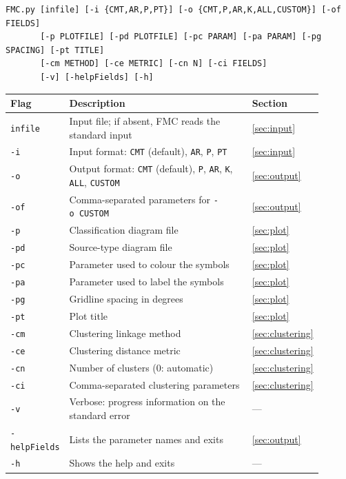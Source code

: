 \documentclass[11pt,a4paper,english]{article}
\numberwithin{equation}{section}
\begin{document}
\begin{lstlisting}
FMC.py [infile] [-i {CMT,AR,P,PT}] [-o {CMT,P,AR,K,ALL,CUSTOM}] [-of FIELDS]
       [-p PLOTFILE] [-pd PLOTFILE] [-pc PARAM] [-pa PARAM] [-pg SPACING] [-pt TITLE]
       [-cm METHOD] [-ce METRIC] [-cn N] [-ci FIELDS]
       [-v] [-helpFields] [-h]
\end{lstlisting}

\begin{longtable}{p{0.163\linewidth}p{0.631\linewidth}p{0.102\linewidth}}
\toprule
\textbf{Flag} & \textbf{Description} & \textbf{Section} \\
\midrule
\endhead
\texttt{infile} & Input file; if absent, FMC reads the standard input & \ref{sec:input} \\
\texttt{-i} & Input format: \texttt{CMT} (default), \texttt{AR}, \texttt{P}, \texttt{PT} & \ref{sec:input} \\
\texttt{-o} & Output format: \texttt{CMT} (default), \texttt{P}, \texttt{AR}, \texttt{K}, \texttt{ALL}, \texttt{CUSTOM} & \ref{sec:output} \\
\texttt{-of} & Comma-separated parameters for \texttt{-o\ CUSTOM} & \ref{sec:output} \\
\texttt{-p} & Classification diagram file & \ref{sec:plot} \\
\texttt{-pd} & Source-type diagram file & \ref{sec:plot} \\
\texttt{-pc} & Parameter used to colour the symbols & \ref{sec:plot} \\
\texttt{-pa} & Parameter used to label the symbols & \ref{sec:plot} \\
\texttt{-pg} & Gridline spacing in degrees & \ref{sec:plot} \\
\texttt{-pt} & Plot title & \ref{sec:plot} \\
\texttt{-cm} & Clustering linkage method & \ref{sec:clustering} \\
\texttt{-ce} & Clustering distance metric & \ref{sec:clustering} \\
\texttt{-cn} & Number of clusters (0: automatic) & \ref{sec:clustering} \\
\texttt{-ci} & Comma-separated clustering parameters & \ref{sec:clustering} \\
\texttt{-v} & Verbose: progress information on the standard error & --- \\
\texttt{-helpFields} & Lists the parameter names and exits & \ref{sec:output} \\
\texttt{-h} & Shows the help and exits & --- \\
\bottomrule
\end{longtable}
\end{document}
